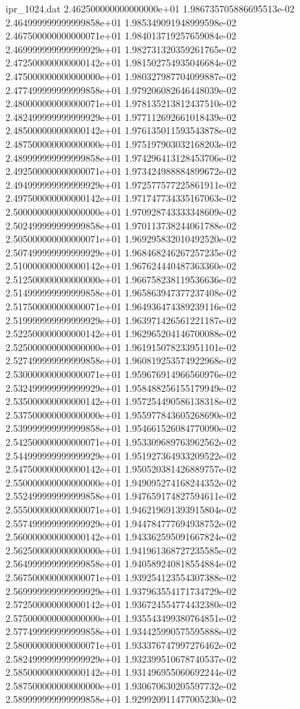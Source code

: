 \begin{filecontents}{ipr_1024.dat}
2.462500000000000000e+01 1.986735705886695513e-02
2.464999999999999858e+01 1.985349091948999598e-02
2.467500000000000071e+01 1.984013719257659084e-02
2.469999999999999929e+01 1.982731320359261765e-02
2.472500000000000142e+01 1.981502754935046684e-02
2.475000000000000000e+01 1.980327987704099887e-02
2.477499999999999858e+01 1.979206082646448039e-02
2.480000000000000071e+01 1.978135213812437510e-02
2.482499999999999929e+01 1.977112692661018439e-02
2.485000000000000142e+01 1.976135011593543878e-02
2.487500000000000000e+01 1.975197903032168203e-02
2.489999999999999858e+01 1.974296413128453706e-02
2.492500000000000071e+01 1.973424988884899672e-02
2.494999999999999929e+01 1.972577577225861911e-02
2.497500000000000142e+01 1.971747734335167063e-02
2.500000000000000000e+01 1.970928743333348609e-02
2.502499999999999858e+01 1.970113738244061788e-02
2.505000000000000071e+01 1.969295832010492520e-02
2.507499999999999929e+01 1.968468246267257235e-02
2.510000000000000142e+01 1.967624440487363360e-02
2.512500000000000000e+01 1.966758238119536636e-02
2.514999999999999858e+01 1.965863947377237408e-02
2.517500000000000071e+01 1.964936474389239116e-02
2.519999999999999929e+01 1.963971426561221187e-02
2.522500000000000142e+01 1.962965204146700088e-02
2.525000000000000000e+01 1.961915078233951101e-02
2.527499999999999858e+01 1.960819253574922968e-02
2.530000000000000071e+01 1.959676914966560976e-02
2.532499999999999929e+01 1.958488256155179949e-02
2.535000000000000142e+01 1.957254490586138318e-02
2.537500000000000000e+01 1.955977843605268690e-02
2.539999999999999858e+01 1.954661526084770090e-02
2.542500000000000071e+01 1.953309689763962562e-02
2.544999999999999929e+01 1.951927364933209522e-02
2.547500000000000142e+01 1.950520381426889757e-02
2.550000000000000000e+01 1.949095274168244352e-02
2.552499999999999858e+01 1.947659174827594611e-02
2.555000000000000071e+01 1.946219691393915804e-02
2.557499999999999929e+01 1.944784777694938752e-02
2.560000000000000142e+01 1.943362595091667824e-02
2.562500000000000000e+01 1.941961368727235585e-02
2.564999999999999858e+01 1.940589240818554884e-02
2.567500000000000071e+01 1.939254123554307388e-02
2.569999999999999929e+01 1.937963554171734729e-02
2.572500000000000142e+01 1.936724554774432380e-02
2.575000000000000000e+01 1.935543499380764851e-02
2.577499999999999858e+01 1.934425990575595888e-02
2.580000000000000071e+01 1.933376747997276462e-02
2.582499999999999929e+01 1.932399510678740537e-02
2.585000000000000142e+01 1.931496955060692244e-02
2.587500000000000000e+01 1.930670630205597732e-02
2.589999999999999858e+01 1.929920911477005230e-02

\end{filecontents}
